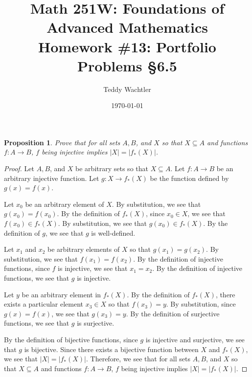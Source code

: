 \documentclass{amsart}
\newtheorem*{proposition}{Proposition}
\newcommand{\img}{_{*}}
\newcommand{\abs}[1]{\left|#1\right|}
\numberwithin{equation}{section}
\begin{document}
	\title[Math 251W: Homework \#13]{
		Math 251W: Foundations of Advanced Mathematics \\
		\textmd{Homework \#13: Portfolio Problems \S 6.5}}
	\author{Teddy Wachtler}
	\date{\today}

	\maketitle

	\begin{problem}[manual-num=65]
		\begin{proposition}
			Prove that for all sets $A, B$, and $X$ so that $X \subseteq A$ and functions $f : A \rightarrow B$, $f$ being injective implies $|X| = |f \img (X)|$.
		\end{proposition}

		\begin{proof}
			Let $A, B$, and $X$ be arbitrary sets so that $X \subseteq A$.
			Let $f : A \rightarrow B$ be an arbitrary injective function.
			Let $g : X \rightarrow f \img (X)$ be the function defined by $g(x) = f(x)$.

			Let $x_0$ be an arbitrary element of $X$.
			By substitution, we see that $g(x_0) = f(x_0)$.
			By the definition of $f \img (X)$, since $x_0 \in X$, we see that $f(x_0) \in f \img (X)$.
			By substitution, we see that $g(x_0) \in f \img (X)$.
			By the definition of $g$, we see that $g$ is well-defined.

			Let $x_1$ and $x_2$ be arbitrary elements of $X$ so that $g(x_1) = g(x_2)$.
			By substitution, we see that $f(x_1) = f(x_2)$.
			By the definition of injective functions, since $f$ is injective, we see that $x_1 = x_2$.
			By the definition of injective functions, we see that $g$ is injective.

			Let $y$ be an arbitrary element in $f \img (X)$.
			By the definition of $f \img (X)$, there exists a particular element $x_3 \in X$ so that $f(x_3) = y$.
			By substitution, since $g(x) = f(x)$, we see that $g(x_3) = y$.
			By the definition of surjective functions, we see that $g$ is surjective.

			By the definition of bijective functions, since $g$ is injective and surjective, we see that $g$ is bijective.
			Since there exists a bijective function between $X$ and $f \img (X)$, we see that $\abs{X} = \abs{f \img (X)}$.
			Therefore, we see that for all sets $A, B$, and $X$ so that $X \subseteq A$ and functions $f : A \rightarrow B$, $f$ being injective implies $|X| = |f \img (X)|$.
		\end{proof}
	\end{problem}
\end{document}
